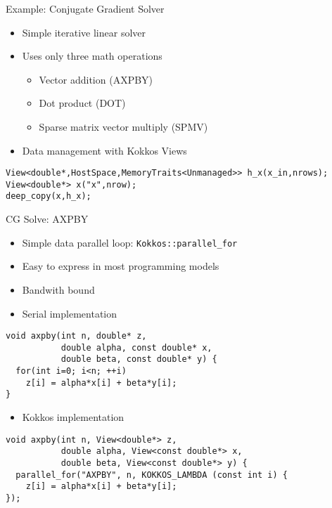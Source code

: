 \begin{frame}[fragile]{Example: Conjugate Gradient Solver}
\begin{itemize}
        \item Simple iterative linear solver
        \item Uses only three math operations
                \begin{itemize}
                        \item Vector addition (AXPBY)
                        \item Dot product (DOT)
                        \item Sparse matrix vector multiply (SPMV)
                \end{itemize}
        \item Data management with Kokkos Views
\end{itemize}
\begin{lstlisting}
View<double*,HostSpace,MemoryTraits<Unmanaged>> h_x(x_in,nrows);
View<double*> x("x",nrow);
deep_copy(x,h_x);
\end{lstlisting}
\end{frame}

\begin{frame}[fragile]{CG Solve: AXPBY}
\begin{itemize}
        \item Simple data parallel loop: \texttt{Kokkos::parallel\_for}
        \item Easy to express in most programming models
        \item Bandwith bound
        \item Serial implementation
\end{itemize}
\begin{lstlisting}
void axpby(int n, double* z,
           double alpha, const double* x,
           double beta, const double* y) {
  for(int i=0; i<n; ++i)
    z[i] = alpha*x[i] + beta*y[i];
}
\end{lstlisting}
\vspace{-5pt}
\begin{itemize}
        \item Kokkos implementation
\end{itemize}
\begin{lstlisting}
void axpby(int n, View<double*> z,
           double alpha, View<const double*> x,
           double beta, View<const double*> y) {
  parallel_for("AXPBY", n, KOKKOS_LAMBDA (const int i) {
    z[i] = alpha*x[i] + beta*y[i];
});
\end{lstlisting}
\end{frame}

